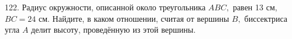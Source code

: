 122. Радиус окружности, описанной около треугольника $ABC,$ равен 13 см, $BC=24$ см. Найдите, в каком отношении, считая от вершины $B,$ биссектриса угла $A$ делит высоту, проведённую из этой вершины.\\
